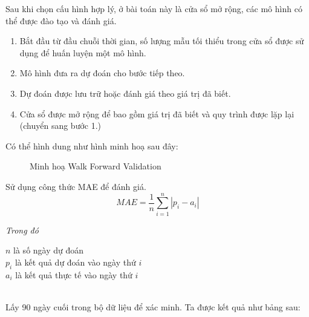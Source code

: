Sau khi chọn cấu hình hợp lý, ở bài toán này là cửa sổ mở rộng, các mô hình có thể được đào tạo và đánh giá.
\begin{enumerate}
	\item Bắt đầu từ đầu chuỗi thời gian, số lượng mẫu tối thiểu trong cửa sổ được sử dụng để huấn luyện một mô hình.
	\item Mô hình đưa ra dự đoán cho bước tiếp theo.
	\item Dự đoán được lưu trữ hoặc đánh giá theo giá trị đã biết.
	\item Cửa sổ được mở rộng để bao gồm giá trị đã biết và quy trình được lặp lại (chuyển sang bước 1.)
\end{enumerate}

Có thể hình dung như hình minh hoạ sau đây:
\begin{figure}[h]
    \caption{\label{fig:walkforward} Minh hoạ Walk Forward Validation}
\end{figure}

Sử dụng công thức MAE để đánh giá. \\
\[MAE = \frac{1}{n}\sum_{i=1}^{n}|p_i - a_i|\]
\begin{minipage}[t]{.27\textwidth}
	\textit{Trong đó}
\end{minipage}
\hspace*{15pt}
\begin{minipage}[t]{.65\textwidth}
	\(n\) là số ngày dự đoán \\
	\(p_i\) là kết quả dự đoán vào ngày thứ \(i\) \\
	\(a_i\) là kết quả thực tế vào ngày thứ \(i\) \\
\end{minipage} \\[5mm]

Lấy 90 ngày cuối trong bộ dữ liệu để xác minh. Ta được kết quả như bảng sau: \\

